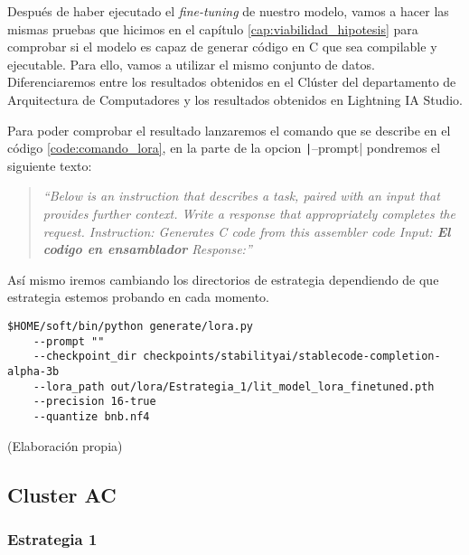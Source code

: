 
Después de haber ejecutado el \textit{fine-tuning} de nuestro modelo, vamos a hacer las mismas pruebas
que hicimos en el capítulo \ref{cap:viabilidad_hipotesis} para comprobar si el modelo es capaz de
generar código en C que sea compilable y ejecutable. Para ello, vamos a utilizar el mismo conjunto
de datos. Diferenciaremos entre los resultados obtenidos en el Clúster del departamento de Arquitectura
de Computadores y los resultados obtenidos en Lightning IA Studio.

Para poder comprobar el resultado lanzaremos el comando que se describe en el código \ref{code:comando_lora},
en la parte de la opcion \texttt|--prompt| pondremos el siguiente texto:

\begin{quote}
    \textit{``Below is an instruction that describes a task, paired with an input that provides further context.
    Write a response that appropriately completes the request. \newline
    Instruction: Generates C code from this assembler code \newline
    Input: \textbf{El codigo en ensamblador}\newline
    Response:''}
\end{quote}

Así mismo iremos cambiando los directorios de estrategia dependiendo de que estrategia estemos probando
en cada momento.

\begin{mycode}
    \begin{verbatim}
$HOME/soft/bin/python generate/lora.py 
    --prompt "" 
    --checkpoint_dir checkpoints/stabilityai/stablecode-completion-alpha-3b 
    --lora_path out/lora/Estrategia_1/lit_model_lora_finetuned.pth 
    --precision 16-true
    --quantize bnb.nf4

    \end{verbatim}
    \caption[]{ (Elaboración propia)}
    \label{code:comando_lora}
\end{mycode}

\subsection{Cluster AC}
\label{subsec:cluster_ac}

\subsubsection{Estrategia 1}
\label{subsubsec:resultados:estrategia_1}

